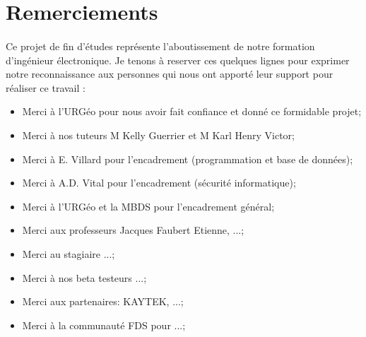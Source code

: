 \section{Remerciements}
\paragraph{}
Ce projet de fin d’études représente l'aboutissement de notre formation d’ingénieur électronique. 
Je tenons à reserver ces quelques lignes pour exprimer notre
reconnaissance aux personnes qui nous ont apporté leur support pour réaliser ce travail :

\begin{itemize}
    \item Merci à l'URGéo pour nous avoir fait confiance et donné ce formidable projet;\par
    \item Merci à nos tuteurs M Kelly Guerrier et M Karl Henry Victor;\par
    \item Merci à  E. Villard pour l'encadrement (programmation et base de données);\par
    \item Merci à A.D. Vital pour l'encadrement (sécurité informatique);\par
    \item Merci à l'URGéo et la MBDS pour l'encadrement général;\par
    \item Merci aux professeurs Jacques Faubert Etienne, ...;\par
    \item Merci au stagiaire ...;\par
    \item Merci à nos beta testeurs ...;\par
    \item Merci aux partenaires: KAYTEK, ...;\par
    \item Merci à la communauté FDS pour ...;\par
\end{itemize}
